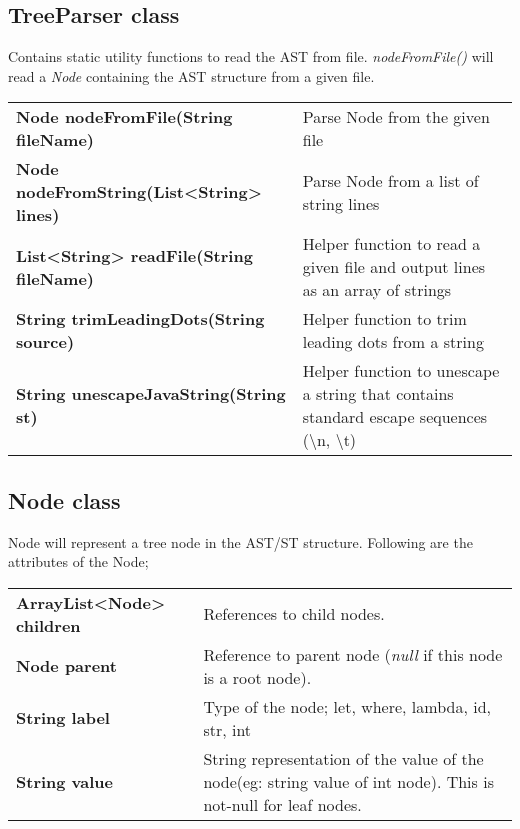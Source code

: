 \documentclass[12pt,a4paper]{article}
\begin{document}
\subsection{TreeParser class}
    Contains static utility functions to read the AST from file. \textit{nodeFromFile()} will read a \textit{Node} containing the AST structure from a given file. \\

    \begin{tabular}{lp{8cm}}
        \textbf{Node nodeFromFile(String fileName)} & Parse Node from the given file \\
        \textbf{Node nodeFromString(List<String> lines)} & Parse Node from a list of string lines \\
        \textbf{List<String> readFile(String fileName)} & Helper function to read a given file and output lines as an array of strings \\
        \textbf{String trimLeadingDots(String source)} & Helper function to trim leading dots from a string \\
        \textbf{String unescapeJavaString(String st)} & Helper function to unescape a string that contains standard escape sequences (\textbackslash n, \textbackslash t) \\
    \end{tabular}

\newpage

\subsection{Node class}
    Node will represent a tree node in the AST/ST structure. Following are the attributes of the Node;\\

    \begin{tabular}{lp{10cm}}
        \textbf{ArrayList<Node> children} & References to child nodes. \\
        \textbf{Node parent} & Reference to parent node (\textit{null} if this node is a root node). \\
        \textbf{String label} & Type of the node; let, where, lambda, id, str, int \\
        \textbf{String value} &  String representation of the value of the node(eg: string value of int node). This is not-null for leaf nodes.\\
    \end{tabular} \\
\end{document}
